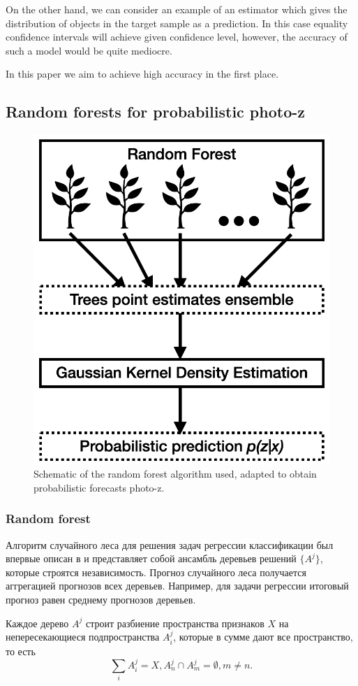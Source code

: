 \documentclass[fleqn,usenatbib]{mnras}
\begin{document}
On the other hand, we can consider an example of an estimator which gives the distribution of objects in the target sample as a prediction. In this case equality confidence intervals will achieve given confidence level, however, the accuracy of such a model would be quite mediocre.

In this paper we aim to achieve high accuracy in the first place.



\subsection{Random forests for probabilistic photo-z}

\begin{figure}
    \centering
    \includegraphics[width=0.55\linewidth]{images/qrf.png}
    \caption{Schematic of the random forest algorithm used, adapted to obtain probabilistic forecasts photo-z.}
    \label{fig:qrf_scheme}
\end{figure}

\subsubsection{Random forest}
Алгоритм случайного леса для решения задач регрессии классификации был впервые описан в \citep{2001MachL..45....5B} и представляет собой ансамбль деревьев решений $\{A^j\}$, которые строятся независимость. Прогноз случайного леса получается аггрегацией прогнозов всех деревьев. Например, для задачи регрессии итоговый прогноз равен среднему прогнозов деревьев.

Каждое дерево $A^j$ строит разбиение пространства признаков $X$ на непересекающиеся подпространства $A^j_i$, которые в сумме дают все пространство, то есть
\begin{equation}
    \sum_i A^j_i = X, A^j_n \cap A^j_m = \emptyset, m \neq n.
\end{equation}
\end{document}
